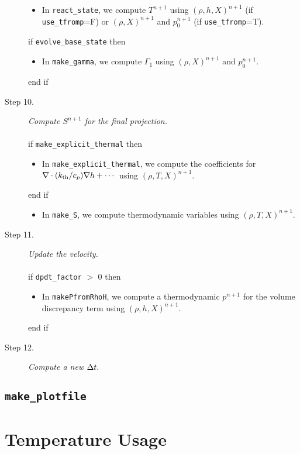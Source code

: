 \begin{description}
\begin{itemize}
\item In {\tt react\_state}, we compute $T^{n+1}$ using $(\rho,h,X)^{n+1}$ 
(if {\tt use\_tfromp}=F) or $(\rho,X)^{n+1}$ and $p_0^{n+1}$ (if {\tt use\_tfromp}=T).
\end{itemize}
if {\tt evolve\_base\_state} then
\begin{itemize}
\item In {\tt make\_gamma}, we compute $\Gamma_1$ using $(\rho,X)^{n+1}$ and $p_0^{n+1}$.
\end{itemize}
end if
\item[Step 10.] {\em Compute $S^{n+1}$ for the final projection.}\\ \\
if {\tt make\_explicit\_thermal} then
\begin{itemize}
\item In {\tt make\_explicit\_thermal}, we compute the coefficients for 
$\nabla\cdot(k_{\rm th}/c_p)\nabla h + \cdots$ using $(\rho,T,X)^{n+1}$.
\end{itemize}
end if
\begin{itemize}
\item In {\tt make\_S}, we compute thermodynamic variables using $(\rho,T,X)^{n+1}$.
\end{itemize}
\item[Step 11.] {\em Update the velocity.}\\ \\
if {\tt dpdt\_factor} $>$ 0 then
\begin{itemize}
\item In {\tt makePfromRhoH}, we compute a thermodynamic $p^{n+1}$ for the volume 
discrepancy term using $(\rho,h,X)^{n+1}$.
\end{itemize}
end if
\item[Step 12.] {\em Compute a new $\Delta t.$}
\end{description}
\subsection{{\tt make\_plotfile}}
\section{Temperature Usage}

